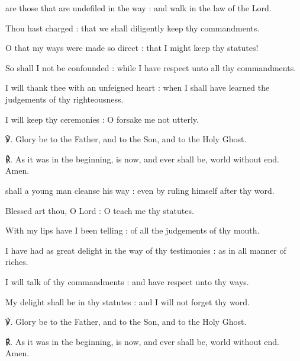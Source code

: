  are those that are undefiled in the way : and walk in the law of the Lord.\par
{}
Thou hast charged : that we shall diligently keep thy commandments.\par
{}O that my ways were made so direct : that I might keep thy statutes!\par
{}So shall I not be confounded : while I have respect unto all thy commandments.\par
{}I will thank thee with an unfeigned heart : when I shall have learned the judgements of thy righteousness.\par
{}I will keep thy ceremonies : O forsake me not utterly.\par
℣. Glory be to the Father, and to the Son, and to the Holy Ghost.\par
℟. As it was in the beginning, is now, and ever shall be, world without end. Amen.

\vspace{-1.625ex}
 shall a young man cleanse his way : even by ruling himself after thy word.\par
{}
Blessed art thou, O Lord : O teach me thy statutes.\par
{}With my lips have I been telling : of all the judgements of thy mouth.\par
{}I have had as great delight in the way of thy testimonies : as in all manner of riches.\par
{}I will talk of thy commandments : and have respect unto thy ways.\par
{}My delight shall be in thy statutes : and I will not forget thy word.\par
℣. Glory be to the Father, and to the Son, and to the Holy Ghost.\par
℟. As it was in the beginning, is now, and ever shall be, world without end. Amen.


